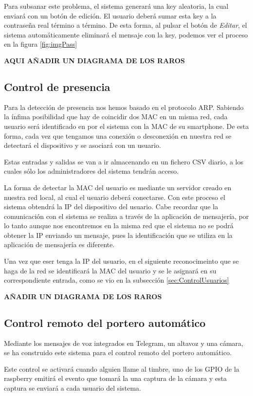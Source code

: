 \documentclass[10pt,journal,compsoc]{IEEEtran}
\begin{document}
Para subsanar este problema, el sistema generará una key aleatoria, la cual enviará con un 
botón de edición. El usuario deberá sumar esta key a la contraseña real término a término.
De esta forma, al pulsar el botón de \textit{Editar}, el sistema automáticamente eliminará el 
mensaje con la key, podemos ver el proceso en la figura \ref{fig:imgPass}

\textbf{AQUI AÑADIR UN DIAGRAMA DE LOS RAROS}

\subsection{Control de presencia}
Para la detección de presencia nos hemos basado en el protocolo ARP. Sabiendo la 
ínfima posibilidad que hay de coincidir dos MAC en un misma red, cada usuario 
será identificado en por el sistema con la MAC de su smartphone. De esta forma, 
cada vez que tengamos una conexión o desconexión en nuestra red se detectará el 
dispositivo y se asociará con un usuario.

Estas entradas y salidas se van a ir almacenando en un fichero CSV diario, a los 
cuales sólo los administradores del sistema tendrán acceso. 

La forma de detectar la MAC del usuario es mediante un servidor creado en 
nuestra red local, al cual el usuario deberá conectarse. Con este proceso el 
sistema obtendrá la IP del dispositivo del usuario. 
Cabe recordar que la comunicación con el sistema se realiza a través de la 
aplicación de mensajería, por lo tanto aunque nos encontremos en la misma red 
que el sistema no se podrá obtener la IP enviando un mensaje, pues la 
identificación que se utiliza en la aplicación de mensajería es diferente.

Una vez que eser tenga la IP del usuario, en el siguiente reconocimeinto que se 
haga de la red se identificará la MAC del usuario y se le asignará en su 
correspondiente entrada, como se vio en la subsección \ref{sec:ControlUsuarios}

\textbf{AÑADIR UN DIAGRAMA DE LOS RAROS}

\subsection{Control remoto del portero automático}
Mediante los mensajes de voz integrados en Telegram, un altavoz y una cámara, se  
ha construido este sistema para el control remoto del portero automático. 

Este control se activará cuando alguien llame al timbre, uno de los GPIO de la 
raspberry emitirá el evento que tomará la una captura de la cámara y esta 
captura se enviará a cada usuario del sistema. 
\end{document}
